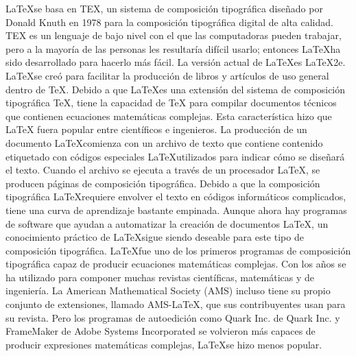 \documentclass[letterpaper, 10pt, journal]{IEEEtran}
\begin{document}
\LaTeX   se basa en TEX, un sistema de composici\'on tipogr\'afica dise\~nado por Donald Knuth en 1978 para la composici\'on tipogr\'afica digital de alta calidad. TEX es un lenguaje de bajo nivel con el que las computadoras pueden trabajar, pero a la mayor\'ia de las personas les resultar\'ia dif\'icil usarlo; entonces \LaTeX   ha sido desarrollado para hacerlo m\'as f\'acil. La versi\'on actual de \LaTeX   es \LaTeX 2e. \cite{introductionLatex}
\newline
\LaTeX   se cre\'o para facilitar la producci\'on de libros y art\'iculos de uso general dentro de TeX. Debido a que \LaTeX   es una extensi\'on del sistema de composici\'on tipogr\'afica TeX, tiene la capacidad de TeX para compilar documentos t\'ecnicos que contienen ecuaciones matem\'aticas complejas. Esta caracter\'istica hizo que LaTeX fuera popular entre cient\'ificos e ingenieros. \cite{[1]}
\newline
La producci\'on de un documento \LaTeX   comienza con un archivo de texto que contiene contenido etiquetado con c\'odigos especiales \LaTeX   utilizados para indicar c\'omo se dise\~nar\'a el texto. Cuando el archivo se ejecuta a trav\'es de un procesador \LaTeX  , se producen p\'aginas de composici\'on tipogr\'afica. Debido a que la composici\'on tipogr\'afica \LaTeX   requiere envolver el texto en c\'odigos inform\'aticos complicados, tiene una curva de aprendizaje bastante empinada. Aunque ahora hay programas de software que ayudan a automatizar la creaci\'on de documentos \LaTeX  , un conocimiento pr\'actico de \LaTeX   sigue siendo deseable para este tipo de composici\'on tipogr\'afica.
\newline
\LaTeX   fue uno de los primeros programas de composici\'on tipogr\'afica capaz de producir ecuaciones matem\'aticas complejas. Con los a\~nos se ha utilizado para componer muchas revistas cient\'ificas, matem\'aticas y de ingenier\'ia. La American Mathematical Society (AMS) incluso tiene su propio conjunto de extensiones, llamado AMS-LaTeX, que sus contribuyentes usan para su revista. Pero los programas de autoedici\'on como Quark Inc. de Quark Inc. y FrameMaker de Adobe Systems Incorporated se volvieron m\'as capaces de producir expresiones matem\'aticas complejas, \LaTeX   se hizo menos popular.\cite{[1]}
\end{document}
